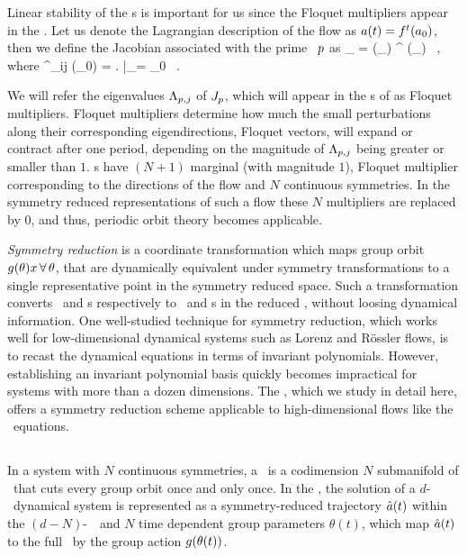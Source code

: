 Linear stability of the \rpo s is important for us since the Floquet multipliers
appear in the \cycForm . Let us denote the Lagrangian description of the flow as
$a(t) = {f^{t}(a_0)}$, then we define the Jacobian associated 
with the prime \rpo\ $p$ as
\beq
\jMps_{\rpprime} = \LieEl (\theta_\rpprime ) \jMps^\period{\rpprime} (\ssp_\rpprime) 
\, , \mbox{where}\quad 
\jMps^{\zeit}_{ij} (\ssp_0) = \left.  \right|_{\ssp = \ssp_0}
\, .

We will refer the eigenvalues $\Lambda_{p,j}$ of $J_{p}$, which will 
appear in the \cycForm s of  as Floquet multipliers. Floquet
multipliers determine how much the small perturbations along their corresponding
eigendirections, Floquet vectors, will expand or contract after one period, depending 
on the magnitude of $\Lambda_{p,j}$ being greater or smaller than $1$. \Rpo s have 
$(N+1)$ marginal (with magnitude $1$), Floquet multiplier corresponding to the 
directions of the flow and $N$ continuous symmetries. In the symmetry reduced 
representations of such a flow these $N$ multipliers are replaced by $0$, and thus, 
periodic orbit theory becomes applicable.

\emph{Symmetry reduction} is a coordinate transformation which maps
group orbit $g (\theta) x \, \forall \, \theta$, that are
dynamically equivalent under symmetry transformations to a single
representative point in the symmetry reduced space. Such a transformation
converts \reqva\ and \rpo s respectively to \eqva\ and \po s in the
reduced \statesp , without loosing dynamical information. One well-studied
technique for symmetry reduction, which works well for low-dimensional
dynamical systems such as Lorenz and R\"{o}ssler flows, is to recast the
dynamical equations in terms of invariant polynomials.
However, establishing an invariant polynomial basis quickly becomes
impractical for systems with more than a dozen
dimensions.
The \mslices%
,
which we study in detail here, offers a symmetry reduction
scheme applicable to high-dimensional flows like the \NS\ equations.

\subsection{\Mslices}
\label{s-slice}

In a system with $N$ continuous symmetries, a \emph{\slice} \pSRed\ is a codimension $N$ submanifold
of \pS\ that cuts every group orbit once and only once. In the \emph{\mslices}, the solution
of a $d$-\dmn\ dynamical system is represented as a symmetry-reduced trajectory $\hat{a} (t)$ within the
$(d-N)$-\dmn\ \slice\ and $N$ time dependent group parameters $\theta(t)$, which
map $\hat{a} (t)$ to the full \statesp\ by the group action $g(\theta(t))$.


